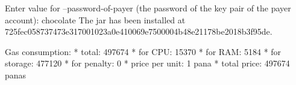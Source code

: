 \begin{shellbox}\begin{ttlst}
Enter value for --password-of-payer (the password of the key pair of the payer account): chocolate
The jar has been installed at 725fec058737473e317001023a0e410069e7500004b48e21178be2018b3f95de.

Gas consumption:
 * total: 497674
   * for CPU: 15370
   * for RAM: 5184
   * for storage: 477120
   * for penalty: 0
 * price per unit: 1 pana
 * total price: 497674 panas
\end{ttlst}\end{shellbox}
